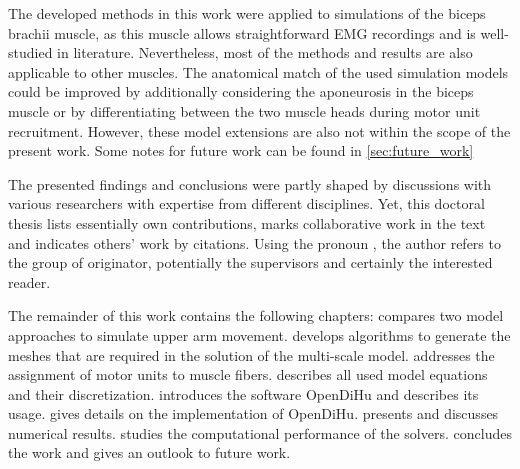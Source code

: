 The developed methods in this work were applied to simulations of the biceps brachii muscle, as this muscle allows straightforward EMG recordings and is well-studied in literature. Nevertheless, most of the methods and results are also applicable to other muscles. The anatomical match of the used simulation models could be improved by additionally considering the aponeurosis in the biceps muscle or by differentiating between the two muscle heads during motor unit recruitment. However, these model extensions are also not within the scope of the present work.
Some notes for future work can be found in \cref{sec:future_work}

The presented findings and conclusions were partly shaped by discussions with various researchers with expertise from different disciplines. Yet, this doctoral thesis lists essentially own contributions, marks collaborative work in the text and indicates others' work by citations.
Using the pronoun , the author refers to the group of originator, potentially the supervisors and certainly the interested reader.

The remainder of this work contains the following chapters:
 compares two model approaches to simulate upper arm movement.  develops algorithms to generate the meshes that are required in the solution of the multi-scale model.  addresses the assignment of motor units to muscle fibers.  describes all used model equations and their discretization.  introduces the software OpenDiHu and describes its usage.  gives details on the implementation of OpenDiHu.  presents and discusses numerical results.  studies the computational performance of the solvers.  concludes the work and gives an outlook to future work.









